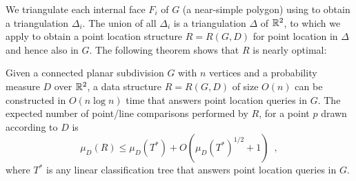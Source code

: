 \documentclass[lotsofwhite]{patmorin}
\begin{document}
We triangulate each internal face $F_i$ of $G$ (a near-simple polygon)
using  to obtain a triangulation
$\Delta_i$. The union of all $\Delta_i$
is a triangulation $\Delta$ of $\mathbb{R}^2$, to which we apply
 to obtain a point location structure $R=R(G,D)$ for
point location in $\Delta$ and hence also in $G$.  The following
theorem shows that $R$ is nearly optimal:

\begin{thm}
Given a connected planar subdivision $G$ with $n$ vertices and a probability
measure $D$ over $\mathbb{R}^2$, a data structure $R=R(G,D)$ of size $O(n)$ can be
constructed in $O(n\log n)$ time that answers point location queries in $G$.
The expected number of point/line comparisons performed by $R$, 
for a point $p$ drawn according to $D$ is 
\[
  \mu_D(R) \le \mu_D(T^*) + O(\mu_D(T^*)^{1/2}+1) \enspace , 
\] 
where $T^*$ is any linear classification tree that answers point
location queries in $G$.
\end{thm}
\end{document}
